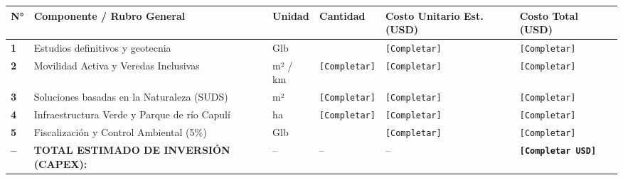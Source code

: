 \documentclass[
  letterpaper,
  DIV=11,
  numbers=noendperiod]{scrreprt}
\newcounter{none} %
\begin{document}
{\def\LTcaptype{none} %
\begin{longtable}[]{@{}
  >{\centering\arraybackslash}p{}
  >{\raggedright\arraybackslash}p{}
  >{\centering\arraybackslash}p{}
  >{\centering\arraybackslash}p{}
  >{\centering\arraybackslash}p{}
  >{\centering\arraybackslash}p{}@{}}
\toprule\noalign{}
\begin{minipage}[b]{\linewidth}\centering
N°
\end{minipage} & \begin{minipage}[b]{\linewidth}\raggedright
Componente / Rubro General
\end{minipage} & \begin{minipage}[b]{\linewidth}\centering
Unidad
\end{minipage} & \begin{minipage}[b]{\linewidth}\centering
Cantidad
\end{minipage} & \begin{minipage}[b]{\linewidth}\centering
Costo Unitario Est. (USD)
\end{minipage} & \begin{minipage}[b]{\linewidth}\centering
Costo Total (USD)
\end{minipage} \\
\midrule\noalign{}
\endhead
\bottomrule\noalign{}
\endlastfoot
\textbf{1} & Estudios definitivos y geotecnia & Glb & 1 &
\texttt{{[}Completar{]}} & \texttt{{[}Completar{]}} \\
\textbf{2} & Movilidad Activa y Veredas Inclusivas & m² / km &
\texttt{{[}Completar{]}} & \texttt{{[}Completar{]}} &
\texttt{{[}Completar{]}} \\
\textbf{3} & Soluciones basadas en la Naturaleza (SUDS) & m² &
\texttt{{[}Completar{]}} & \texttt{{[}Completar{]}} &
\texttt{{[}Completar{]}} \\
\textbf{4} & Infraestructura Verde y Parque de río Capulí & ha &
\texttt{{[}Completar{]}} & \texttt{{[}Completar{]}} &
\texttt{{[}Completar{]}} \\
\textbf{5} & Fiscalización y Control Ambiental (5\%) & Glb & 1 &
\texttt{{[}Completar{]}} & \texttt{{[}Completar{]}} \\
\textbf{--} & \textbf{TOTAL ESTIMADO DE INVERSIÓN (CAPEX):} & -- & -- &
-- & \textbf{\texttt{{[}Completar\ USD{]}}} \\
\end{longtable}
}
\end{document}

